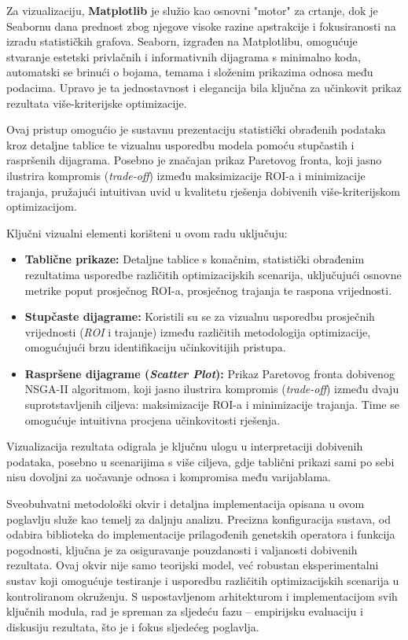 Za vizualizaciju, \textbf{Matplotlib} je služio kao osnovni "motor" za crtanje, dok je Seabornu dana prednost zbog njegove visoke razine apstrakcije i fokusiranosti na izradu statističkih grafova. Seaborn, izgrađen na Matplotlibu, omogućuje stvaranje estetski privlačnih i informativnih dijagrama s minimalno koda, automatski se brinući o bojama, temama i složenim prikazima odnosa među podacima. Upravo je ta jednostavnost i elegancija bila ključna za učinkovit prikaz rezultata više-kriterijske optimizacije.

Ovaj pristup omogućio je sustavnu prezentaciju statistički obrađenih podataka kroz detaljne tablice te vizualnu usporedbu modela pomoću stupčastih i raspršenih dijagrama. Posebno je značajan prikaz Paretovog fronta, koji jasno ilustrira kompromis (\textit{trade-off}) između maksimizacije ROI-a i minimizacije trajanja, pružajući intuitivan uvid u kvalitetu rješenja dobivenih više-kriterijskom optimizacijom.

Ključni vizualni elementi korišteni u ovom radu uključuju:
\begin{itemize}
    \item \textbf{Tablične prikaze:} Detaljne tablice s konačnim, statistički obrađenim rezultatima usporedbe različitih optimizacijskih scenarija, uključujući osnovne metrike poput prosječnog ROI-a, prosječnog trajanja te raspona vrijednosti.
    \item \textbf{Stupčaste dijagrame:} Koristili su se za vizualnu usporedbu prosječnih vrijednosti (\textit{ROI} i trajanje) između različitih metodologija optimizacije, omogućujući brzu identifikaciju učinkovitijih pristupa.
    \item \textbf{Raspršene dijagrame (\textit{Scatter Plot}):} Prikaz Paretovog fronta dobivenog NSGA-II algoritmom, koji jasno ilustrira kompromis (\textit{trade-off}) između dvaju suprotstavljenih ciljeva: maksimizacije ROI-a i minimizacije trajanja. Time se omogućuje intuitivna procjena učinkovitosti rješenja.
\end{itemize}

Vizualizacija rezultata odigrala je ključnu ulogu u interpretaciji dobivenih podataka, posebno u scenarijima s više ciljeva, gdje tablični prikazi sami po sebi nisu dovoljni za uočavanje odnosa i kompromisa među varijablama.

Sveobuhvatni metodološki okvir i detaljna implementacija opisana u ovom poglavlju služe kao temelj za daljnju analizu. Precizna konfiguracija sustava, od odabira biblioteka do implementacije prilagođenih genetskih operatora i funkcija pogodnosti, ključna je za osiguravanje pouzdanosti i valjanosti dobivenih rezultata. Ovaj okvir nije samo teorijski model, već robustan eksperimentalni sustav koji omogućuje testiranje i usporedbu različitih optimizacijskih scenarija u kontroliranom okruženju. S uspostavljenom arhitekturom i implementacijom svih ključnih modula, rad je spreman za sljedeću fazu – empirijsku evaluaciju i diskusiju rezultata, što je i fokus sljedećeg poglavlja.
